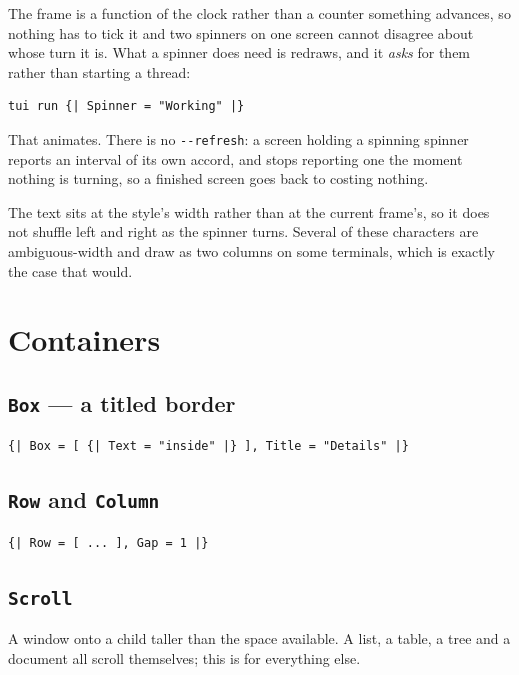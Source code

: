 \documentclass[11pt,a4paper,twoside,openany]{book}
\newcommand{\code}[1]{\texttt{\small #1}}
\begin{document}
The frame is a function of the clock rather than a counter something advances, so
nothing has to tick it and two spinners on one screen cannot disagree about whose
turn it is. What a spinner does need is redraws, and it \emph{asks} for them rather
than starting a thread:

\begin{lstlisting}
tui run {| Spinner = "Working" |}
\end{lstlisting}

\noindent That animates. There is no \code{-{}-refresh}: a screen holding a
spinning spinner reports an interval of its own accord, and stops reporting one the
moment nothing is turning, so a finished screen goes back to costing nothing.

\begin{tipbox}
The text sits at the style's width rather than at the current frame's, so it does
not shuffle left and right as the spinner turns. Several of these characters are
ambiguous-width and draw as two columns on some terminals, which is exactly the
case that would.
\end{tipbox}

\section{Containers}

\subsection{\texttt{Box} --- a titled border}

\begin{lstlisting}
{| Box = [ {| Text = "inside" |} ], Title = "Details" |}
\end{lstlisting}

\subsection{\texttt{Row} and \texttt{Column}}

\begin{lstlisting}
{| Row = [ ... ], Gap = 1 |}
\end{lstlisting}

\subsection{\texttt{Scroll}}

A window onto a child taller than the space available. A list, a table, a tree and
a document all scroll themselves; this is for everything else.
\end{document}
